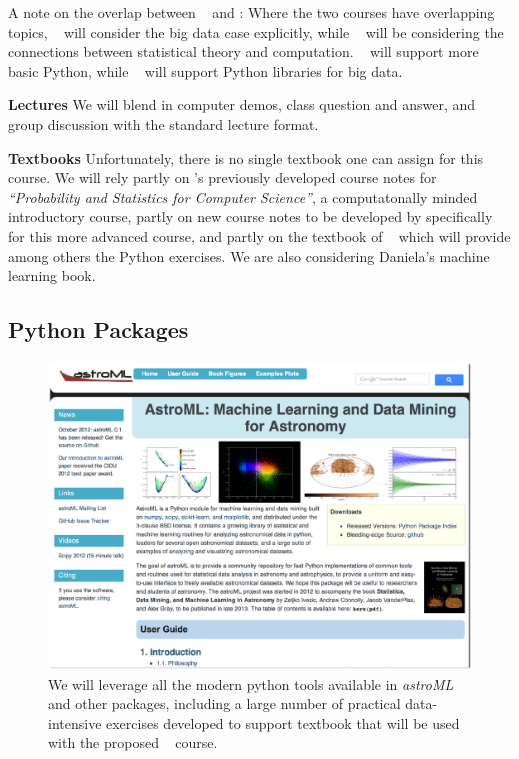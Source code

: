 
A note on the overlap between \statcl~ and \astrocl: Where the two
courses have overlapping topics, \astrocl~ will consider the big data case
explicitly, while \statcl~ will be considering the connections between
statistical theory and computation. \statcl~ will support more basic
Python, while \astrocl~ will support Python libraries for big data.

{\bf Lectures} We will blend in computer demos, class question and answer, and group discussion with the standard lecture format. 

{\bf Textbooks} Unfortunately, there is no single textbook one can
assign for this course. We will rely partly on \meila's previously
developed course notes for {\it ``Probability and Statistics for
  Computer Science''}, a computatonally minded introductory course,
partly on new course notes to be developed by \meila specifically for
this more advanced course, and partly on the textbook of \astrocl~
which will provide among others the Python exercises. We are also considering \cite{} Daniela's machine learning book.


\subsection{Python Packages} 


\begin{figure}[!t]
\vskip -1.8in
\includegraphics[width=1.02\hsize,clip]{astroML.eps}
\vskip -2.0in
\caption{We will leverage all the modern python tools available in {\it astroML} and
other packages, including a large number of practical data-intensive exercises developed to
support textbook that will be used with the proposed \astrocl~ course.} 
\label{Fig:astroML}
\end{figure}


